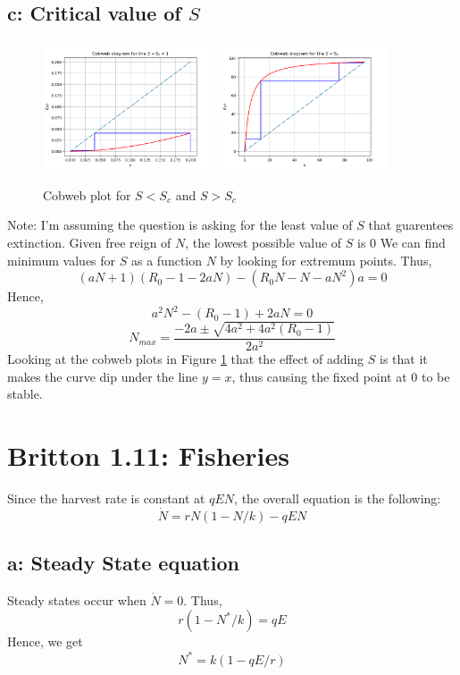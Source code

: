 \documentclass[english]{article}
\begin{document}
\subsection*{c: Critical value of $S$}
\begin{figure}[H]
	\centering
	\includegraphics[width=0.45\textwidth]{plots/problem3_sgsc.png}
	\includegraphics[width=0.45\textwidth]{plots/problem3_slsc.png}
	\caption{Cobweb plot for $S<S_c$ and $S>S_c$}
	\label{fig:problem3c_cobweb}
\end{figure}
Note: I'm assuming the question is asking for the least value of $S$ that
guarentees extinction. Given free reign of $N$, the lowest possible value
of $S$ is 0
We can find minimum values for $S$ as a function $N$ by looking for extremum
points. Thus,
$$ (aN+1)(R_0-1-2aN)-(R_0N-N-aN^{2})a = 0$$
Hence,
$$ a^{2}N^{2}-(R_0-1)+2aN=0 $$
$$ N_{max} = \frac{-2a \pm \sqrt{4a^{2}+4a^{2}(R_0-1)}}{2a^{2}}$$
Looking at the cobweb plots in Figure \ref{fig:problem3c_cobweb} that the
effect of adding $S$ is that it makes the curve dip under the line $y=x$, thus
causing the fixed point at $0$ to be stable.

\section{Britton 1.11: Fisheries}
Since the harvest rate is constant at $qEN$, the overall equation is the following:
$$ \dot{N} = rN(1-N/k)-qEN$$
\subsection*{a: Steady State equation}
Steady states occur when $\dot{N}=0$. Thus,
$$ r(1-N^{*}/k)=qE$$
Hence, we get
$$ N^{*} = k(1-qE/r)$$
\end{document}

